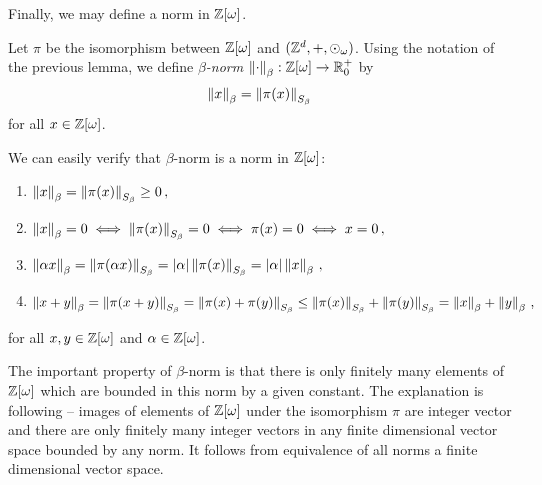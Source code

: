 Finally, we may define a norm in $\mathbb{Z}[\omega]$.
\begin{defn}
Let $\pi$ be the isomorphism between $\mathbb{Z}[\omega]$ and $(\mathbb{Z}^d,+,\odot_\omega)$. Using the notation of the previous lemma, we define \emph{$\beta$-norm}  $\left\lVert\cdot\right\rVert_{\beta}:\mathbb{Z}[\omega] \rightarrow \mathbb{R}^+_0$ by 
$$
\left\lVert x\right\rVert_{\beta}=\left\lVert\pi(x)\right\rVert_{S_\beta}
$$
for all $x\in\mathbb{Z}[\omega]$.
\end{defn}
We can easily verify that $\beta$-norm is a norm in $\mathbb{Z}[\omega]$:
\begin{enumerate}
    \item $\left\lVert x\right\rVert_{\beta}=\left\lVert\pi(x)\right\rVert_{S_\beta}\geq 0\,,$
    \item $\left\lVert x\right\rVert_{\beta}=0 \iff \left\lVert\pi(x)\right\rVert_{S_\beta}=0 \iff \pi(x)=0 \iff x=0\,,$
    \item $\left\lVert\alpha x\right\rVert_{\beta}=\left\lVert\pi(\alpha x)\right\rVert_{S_\beta}=|\alpha|\left\lVert\pi(x)\right\rVert_{S_\beta}=|\alpha|\left\lVert x\right\rVert_{\beta}\,,$
    \item $\left\lVert x+y\right\rVert_{\beta}=\left\lVert\pi(x+y)\right\rVert_{S_\beta}=\left\lVert\pi(x)+\pi(y)\right\rVert_{S_\beta}\leq \left\lVert\pi(x)\right\rVert_{S_\beta}+\left\lVert\pi(y)\right\rVert_{S_\beta}=\left\lVert x\right\rVert_{\beta}+\left\lVert y\right\rVert_{\beta}\,,$
\end{enumerate}
for all $x,y \in \mathbb{Z}[\omega]$ and $\alpha \in \mathbb{Z}[\omega]$.

The important property of $\beta$-norm is that there is only finitely many elements of $\mathbb{Z}[\omega]$ which are bounded in this norm by a given constant. The explanation is following -- images of elements of $\mathbb{Z}[\omega]$ under the isomorphism $\pi$ are integer vector and there are only finitely many integer vectors in any finite dimensional vector space bounded by any norm. It follows from equivalence of all norms a finite dimensional vector space.

